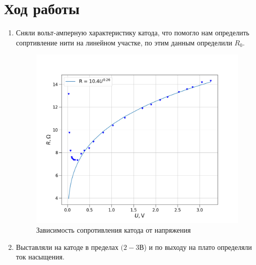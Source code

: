 \documentclass[a4paper, 12pt]{article}
\begin{document}
\newpage

\section{Ход работы}

\begin{enumerate}
\item Сняли вольт-амперную характеристику катода, что помогло нам определить сопртивление
нити на линейном участке, по этим данным определили $R_0$.

\begin{figure}[H]
        \centering
        \includegraphics[scale=0.5]{./pics/resist.png}
        \caption{Зависимость сопротивления катода от напряжения}
\end{figure}

\newpage
\item Выставляли на катоде в пределах $(2 - 3 \text{В}$) и по выходу на плато определяли
ток насыщения.


\end{enumerate}
\end{document}
